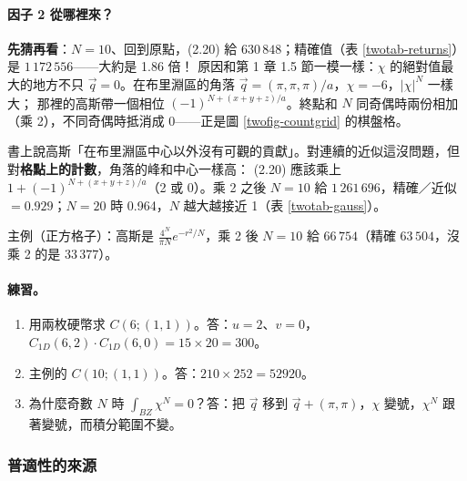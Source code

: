 \paragraph{因子 2 從哪裡來？}
\textbf{先猜再看}：$N=10$、回到原點，(2.20) 給 $630\,848$；精確值（表 \ref{twotab-returns}）是 $1\,172\,556$——大約是 1.86 倍！
原因和第 1 章 1.5 節一模一樣：$\chi$ 的絕對值最大的地方不只 $\vec q=0$。在布里淵區的角落 $\vec q=(\pi,\pi,\pi)/a$，$\chi=-6$，$|\chi|^N$ 一樣大；
那裡的高斯帶一個相位 $(-1)^{N+(x+y+z)/a}$。終點和 $N$ 同奇偶時兩份相加（乘 2），不同奇偶時抵消成 0——正是圖 \ref{twofig-countgrid} 的棋盤格。
\begin{errbox}[p.~34，(2.20) 前]
書上說高斯「在布里淵區中心以外沒有可觀的貢獻」。對連續的近似這沒問題，但對\textbf{格點上的計數}，角落的峰和中心一樣高：
(2.20) 應該乘上 $1+(-1)^{N+(x+y+z)/a}$（2 或 0）。乘 2 之後 $N=10$ 給 $1\,261\,696$，精確／近似 $=0.929$；$N=20$ 時 0.964，$N$ 越大越接近 1（表 \ref{twotab-gauss}）。
\end{errbox}
\begin{table}[H]
\centering
\caption{高斯近似 (2.20) 與精確值：乘上奇偶性的因子 2 之後，比值趨近 1}\label{twotab-gauss}
\TwoTabGauss
\end{table}
主例（正方格子）：高斯是 $\frac{4^N}{\pi N}e^{-r^2/N}$，乘 2 後 $N=10$ 給 $66\,754$（精確 $63\,504$，沒乘 2 的是 $33\,377$）。

\paragraph{練習。}
\begin{enumerate}
\item 用兩枚硬幣求 $C(6;(1,1))$。\quad 答：$u=2$、$v=0$，$C_{1D}(6,2)\cdot C_{1D}(6,0)=15\times20=300$。
\item 主例的 $C(10;(1,1))$。\quad 答：$210\times252=52920$。
\item 為什麼奇數 $N$ 時 $\int_{BZ}\chi^N=0$？\quad 答：把 $\vec q$ 移到 $\vec q+(\pi,\pi)$，$\chi$ 變號，$\chi^N$ 跟著變號，而積分範圍不變。
\end{enumerate}

\subsubsection{普適性的來源}

